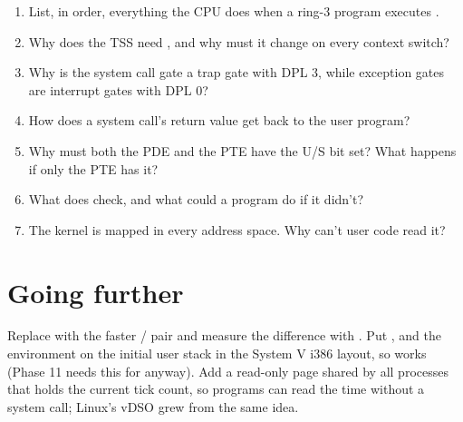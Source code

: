 \documentclass[11pt,a4paper]{article}
\begin{document}
\begin{questionbox}
\begin{enumerate}
  \item List, in order, everything the CPU does when a ring-3 program executes .
  \item Why does the TSS need , and why must it change on every context switch?
  \item Why is the system call gate a trap gate with DPL 3, while exception gates are interrupt gates with DPL 0?
  \item How does a system call's return value get back to the user program?
  \item Why must both the PDE and the PTE have the U/S bit set? What happens if only the PTE has it?
  \item What does  check, and what could a program do if it didn't?
  \item The kernel is mapped in every address space. Why can't user code read it?
\end{enumerate}
\end{questionbox}

\section{Going further}

Replace  with the faster / pair and measure the difference with
. Put ,  and the environment on the initial user stack in the System V i386 layout,
so  works (Phase 11 needs this for  anyway). Add a read-only page shared by
all processes that holds the current tick count, so programs can read the time without a system call; Linux's vDSO
grew from the same idea.

\booklegend
\end{document}
